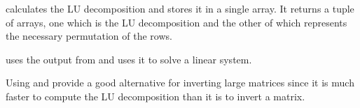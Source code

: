  calculates the LU decomposition and stores it in a single array.
It returns a tuple of arrays, one which is the LU decomposition and the other of which represents the necessary permutation of the rows.

 uses the output from  and uses it to solve a linear system.

Using  and  provide a good alternative for inverting large matrices since it is much faster to compute the LU decomposition than it is to invert a matrix.
